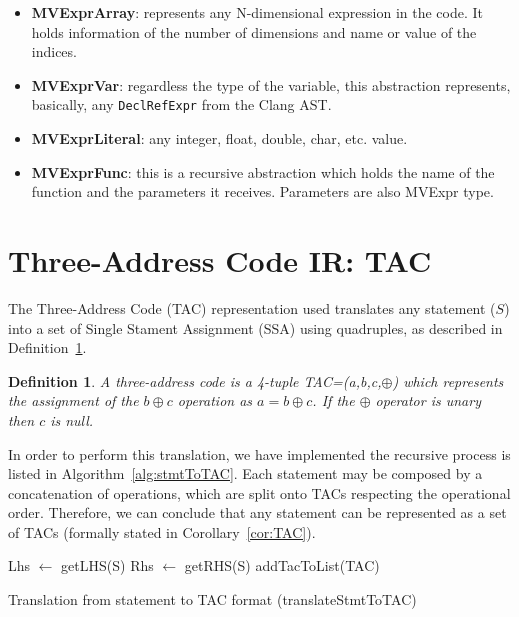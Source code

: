 \documentclass[a4paper,12pt]{memoir}
\newtheorem{definition}{Definition}[]
\begin{document}
\begin{itemize}
	\item \textbf{MVExprArray}: represents any N-dimensional expression in the 
	code. It 
	holds information of the number of dimensions and name or value of the 
	indices.
	\item \textbf{MVExprVar}: regardless the type of the variable, this 
	abstraction 
	represents, basically, any \texttt{DeclRefExpr} from the Clang AST.
	\item \textbf{MVExprLiteral}: any integer, float, double, char, etc. value.
	\item \textbf{MVExprFunc}: this is a recursive abstraction which holds the 
	name of the function and the parameters it receives. Parameters are also 
	MVExpr 
	type.
\end{itemize}

\section{Three-Address Code IR: TAC}
The Three-Address Code (TAC) representation used translates any statement ($S$) 
into a
set of Single Stament Assignment (SSA) using quadruples, as described in 
Definition~\ref{def:TAC}.

\theoremstyle{definition}
\begin{definition}\label{def:TAC}
	A three-address code is a 4-tuple TAC=(a,b,c,$\oplus$) which represents the 
	assignment of the $b \oplus c$ operation as $a
	= 
	b \oplus c$. If the $\oplus$ operator is unary then $c$ is null.
\end{definition}

In order to perform this translation, we have implemented the recursive process 
is listed in 
Algorithm~\ref{alg:stmtToTAC}. Each statement may be composed by a 
concatenation of operations, which are split onto TACs respecting the 
operational order. Therefore, we can conclude that any statement 
can be represented as a set of TACs (formally stated in 
Corollary~\ref{cor:TAC}).

\begin{algorithm}[H]\label{alg:stmtToTAC}
	\SetAlgoLined
	Lhs $\leftarrow$ getLHS(S)\;
	Rhs $\leftarrow$ getRHS(S)\;
	addTacToList(TAC)\;
	\caption{Translation from statement to TAC format (translateStmtToTAC)}
\end{algorithm}
\end{document}
